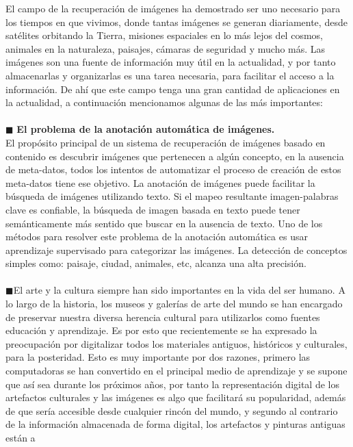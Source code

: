 \documentclass{llncs}
\begin{document}
El campo de la recuperación de imágenes ha demostrado ser uno necesario para los tiempos en que vivimos, donde tantas imágenes 
se generan diariamente, desde satélites orbitando la Tierra, misiones espaciales en lo más lejos del cosmos, 
animales en la naturaleza, paisajes, cámaras de seguridad y mucho más. Las imágenes son una fuente de información 
muy útil en la actualidad, y por tanto almacenarlas y organizarlas es una tarea necesaria, para facilitar 
el acceso a la información. De ahí que este campo tenga una gran cantidad de aplicaciones en la actualidad, 
a continuación mencionamos algunas de las más importantes:
\\\\
\noindent $\blacksquare$ \textbf{El problema de la anotación automática de imágenes.}\\
El propósito principal de un sistema de recuperación de imágenes basado en contenido es descubrir imágenes que pertenecen a algún 
concepto, en la ausencia de meta-datos, todos los intentos de automatizar el proceso de creación de estos meta-datos tiene ese 
objetivo. La anotación de imágenes puede facilitar la búsqueda de imágenes utilizando texto. Si el mapeo resultante imagen-palabras 
clave es confiable, la búsqueda de imagen basada en texto puede tener semánticamente más sentido que buscar en la ausencia de texto. 
Uno de los métodos para resolver este problema de la anotación automática es usar aprendizaje supervisado para categorizar las 
imágenes. La detección de conceptos simples como: paisaje, ciudad, animales, etc, alcanza una alta precisión.
\\\\
\noindent $\blacksquare$El arte y la cultura siempre han sido importantes en la vida del ser humano. A lo largo de la historia, los museos y galerías 
de arte del mundo se han encargado de preservar nuestra diversa herencia cultural para utilizarlos como fuentes educación y 
aprendizaje. Es por esto que recientemente se ha expresado la preocupación por digitalizar todos los materiales antiguos, 
históricos y culturales, para la posteridad. Esto es muy importante por dos razones, primero las computadoras se han convertido 
en el principal medio de aprendizaje y se supone que así sea durante los próximos años, por tanto la representación digital de 
los artefactos culturales y las imágenes es algo que facilitará su popularidad, además de que sería accesible desde cualquier 
rincón del mundo, y segundo al contrario de la información almacenada de forma digital, los artefactos y pinturas antiguas están a 
\end{document}
